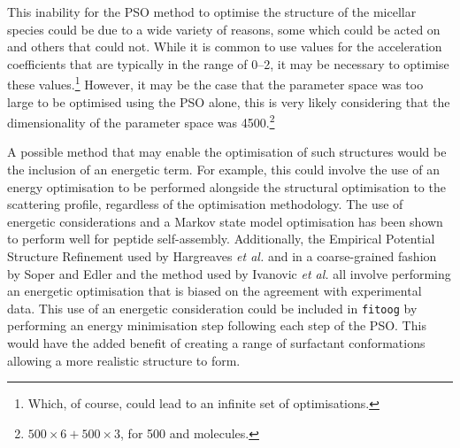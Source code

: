 This inability for the PSO method to optimise the structure of the micellar species could be due to a wide variety of reasons, some which could be acted on and others that could not.
While it is common to use values for the acceleration coefficients that are typically in the range of \numrange{0}{2}, it may be necessary to optimise these values.\footnote{Which, of course, could lead to an infinite set of optimisations.}
However, it may be the case that the parameter space was too large to be optimised using the PSO alone, this is very likely considering that the dimensionality of the parameter space was 4500.\footnote{$500\times6+500\times3$, for 500  and  molecules.}

A possible method that may enable the optimisation of such structures would be the inclusion of an energetic term.
For example, this could involve the use of an energy optimisation to be performed alongside the structural optimisation to the scattering profile, regardless of the optimisation methodology.
The use of energetic considerations and a Markov state model optimisation has been shown to perform well for peptide self-assembly.\autocite{sengupta_automated_2019}
Additionally, the Empirical Potential Structure Refinement used by Hargreaves \emph{et al.}\autocite{hargreaves_atomistic_2011} and in a coarse-grained fashion by Soper and Edler\autocite{soper_coarse-grained_2017} and the method used by Ivanovic \emph{et al.}\autocite{ivanovic_temperature-dependent_2018} all involve performing an energetic optimisation that is biased on the agreement with experimental data.
This use of an energetic consideration could be included in \texttt{fitoog} by performing an energy minimisation step following each step of the PSO.
This would have the added benefit of creating a range of surfactant conformations allowing a more realistic structure to form.
